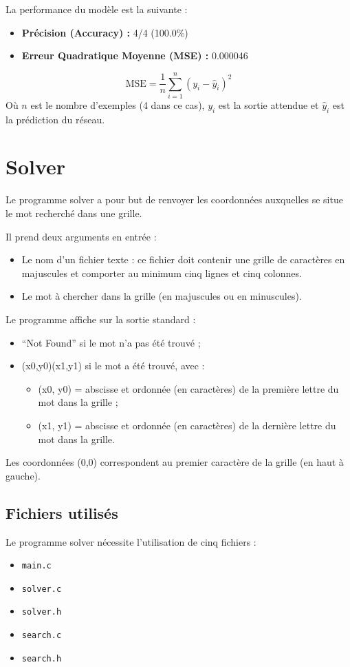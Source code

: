 \documentclass{article}
\begin{document}
La performance du modèle est la suivante :
\begin{itemize}
    \item \textbf{Précision (Accuracy) :} 4/4 (100.0\%)
    \item \textbf{Erreur Quadratique Moyenne (MSE) :} 0.000046
\end{itemize}
\[
\text{MSE} = \frac{1}{n} \sum_{i=1}^{n} (y_i - \hat{y}_i)^2
\]
Où \(n\) est le nombre d'exemples (4 dans ce cas), \(y_i\) est la sortie attendue et \(\hat{y}_i\) est la prédiction du réseau.
\newpage
\section{Solver}
Le programme solver a pour but de renvoyer les coordonnées auxquelles se situe le mot recherché dans une grille.

Il prend deux arguments en entrée :
\begin{itemize}
    \item Le nom d’un fichier texte : ce fichier doit contenir une grille de caractères en majuscules et comporter au minimum cinq lignes et cinq colonnes.
    \item Le mot à chercher dans la grille (en majuscules ou en minuscules).
\end{itemize}

Le programme affiche sur la sortie standard :
\begin{itemize}
    \item ``Not Found'' si le mot n’a pas été trouvé ;
    \item (x0,y0)(x1,y1) si le mot a été trouvé, avec :
    \begin{itemize}
        \item (x0, y0) = abscisse et ordonnée (en caractères) de la première lettre du mot dans la grille ;
        \item (x1, y1) = abscisse et ordonnée (en caractères) de la dernière lettre du mot dans la grille.
    \end{itemize}
\end{itemize}

Les coordonnées (0,0) correspondent au premier caractère de la grille (en haut à gauche).

\subsection{Fichiers utilisés}

Le programme solver nécessite l’utilisation de cinq fichiers :
\begin{itemize}
    \item \texttt{main.c}
    \item \texttt{solver.c}
    \item \texttt{solver.h}
    \item \texttt{search.c}
    \item \texttt{search.h}
\end{itemize}
\end{document}
